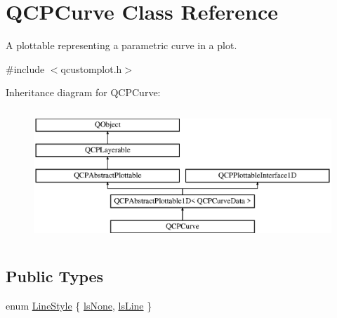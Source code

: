 \hypertarget{class_q_c_p_curve}{}\section{Q\+C\+P\+Curve Class Reference}
\label{class_q_c_p_curve}


A plottable representing a parametric curve in a plot.  




{\ttfamily \#include $<$qcustomplot.\+h$>$}

Inheritance diagram for Q\+C\+P\+Curve\+:\begin{figure}[H]
\begin{center}
\leavevmode
\includegraphics[height=5.000000cm]{d6/d30/class_q_c_p_curve}
\end{center}
\end{figure}
\subsection*{Public Types}
\begin{DoxyCompactItemize}
\item 
enum \mbox{\hyperlink{class_q_c_p_curve_a2710e9f79302152cff794c6e16cc01f1}{Line\+Style}} \{ \mbox{\hyperlink{class_q_c_p_curve_a2710e9f79302152cff794c6e16cc01f1aec1601a191cdf0b4e761c4c66092cc48}{ls\+None}}, 
\mbox{\hyperlink{class_q_c_p_curve_a2710e9f79302152cff794c6e16cc01f1ade5822ce6fbf131d3df131795c2e1003}{ls\+Line}}
 \}
\end{DoxyCompactItemize}
